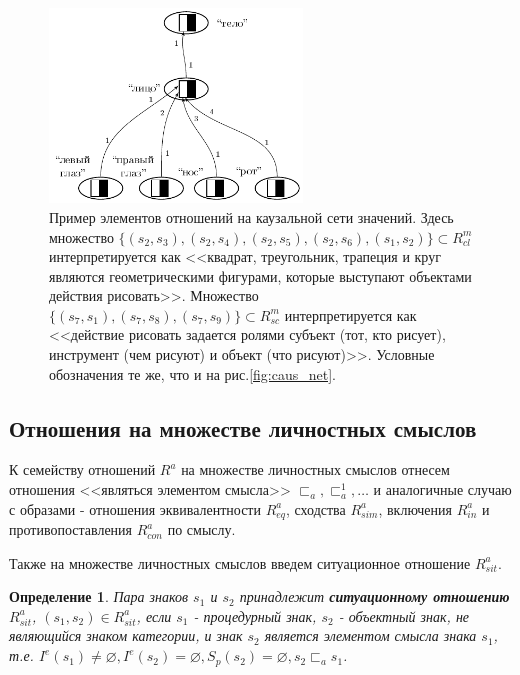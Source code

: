 \documentclass[12pt]{scrartcl}
\newtheorem{definition}{Определение}
\begin{document}
	\begin{figure}[H]
		\centering
		\includegraphics[width=0.6\textwidth,page=2]{examples/causnet/caus_net}
		\caption{Пример элементов отношений на каузальной сети значений. Здесь множество $\{(s_2,s_3),(s_2,s_4),(s_2,s_5),(s_2,s_6),(s_1,s_2)\}\subset R_{cl}^m$ интерпретируется как <<квадрат, треугольник, трапеция и круг являются геометрическими фигурами, которые выступают объектами действия рисовать>>. Множество $\{(s_7,s_1),(s_7,s_8),(s_7,s_9)\}\subset R_{sc}^m$ интерпретируется как <<действие рисовать задается ролями субъект (тот, кто рисует), инструмент (чем рисуют) и объект (что рисуют)>>. Условные обозначения те же, что и на рис.\ref{fig:caus_net}.}
		\label{fig:signif_relat}		
	\end{figure}
	
	\subsection{Отношения на множестве личностных смыслов}	
	К семейству отношений $R^a$ на множестве личностных смыслов отнесем отношения <<являться элементом смысла>> ${\sqsubset_a,\sqsubset_a^1,\dots}$ и аналогичные случаю с образами - отношения эквивалентности $R_{eq}^a$, сходства $R_{sim}^a$, включения $R_{in}^a$ и противопоставления $R_{con}^a$ по смыслу.
	
	Также на множестве личностных смыслов введем ситуационное отношение $R_{sit}^a$.

	\begin{definition}
		Пара знаков $s_1$ и $s_2$ принадлежит \textbf{ситуационному отношению} $R_{sit}^a$, $(s_1,s_2)\in R_{sit}^a$, если $s_1$ - процедурный знак, $s_2$ - объектный знак, не являющийся знаком категории, и знак $s_2$ является элементом смысла знака $s_1$, т.е. $I^e(s_1)\not = \varnothing, I^e(s_2) = \varnothing, S_p(s_2)=\varnothing, s_2\sqsubset_a s_1$.
	\end{definition}
	
\end{document}
